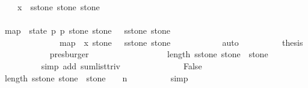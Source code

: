 \begin{isabellebody}
\ {\isachardoublequoteopen}{\isachardot}{\isachardot}{\isachardot}\ {\isacharequal}\ {\isacharparenleft}{\isasymSum}\ x\ {\isasymleftarrow}\ {\isacharquery}sstone\ stone{\isachardot}\ stone\ {\isacharplus}\ {}{\isacharparenright}{\isachardoublequoteclose}\isanewline
\ \ \ \ \ \ \isamarkupfalse%
{\isacharminus}\ \ \ \ \ \ \ \ \ \ \ \ \ \ \ \ \ \ \ \ \ \ \ \ \ \ \ \ \ \ \ \ \ \ \ \ \ \ \ \ \ \ \ \ \ \ \ \isanewline
\ \ \ \ \ \ \ \ \isamarkupfalse%
\ {\isachardoublequoteopen}map\ {\isacharparenleft}{\isasymlambda}\ {\isacharparenleft}state{\isacharcomma}\ p{}{\isacharcomma}\ p{}{\isacharcomma}\ stone{\isacharparenright}{\isachardot}\ stone\ {\isacharplus}\ {}{\isacharparenright}\ {\isacharparenleft}{\isacharquery}sstone\ stone{\isacharparenright}\ {\isacharequal}\ \isanewline
\ \ \ \ \ \ \ \ \ \ \ \ \ \ map\ {\isacharparenleft}{\isasymlambda}\ x{\isachardot}\ stone\ {\isacharplus}\ {}{\isacharparenright}\ {\isacharparenleft}{\isacharquery}sstone\ stone{\isacharparenright}{\isachardoublequoteclose}\isanewline
\ \ \ \ \ \ \ \ \ \ \isamarkupfalse%
\ auto\isanewline
\ \ \ \ \ \ \ \ \isamarkupfalse%
\ {\isacharquery}thesis\isanewline
\ \ \ \ \ \ \ \ \ \ \isamarkupfalse%
\ presburger\isanewline
\ \ \ \ \ \ \isamarkupfalse%
\isanewline
\ \ \ \ \ \ \isamarkupfalse%
\ \isamarkupfalse%
\ {\isachardoublequoteopen}{\isachardot}{\isachardot}{\isachardot}\ {\isacharequal}\ length\ {\isacharparenleft}{\isacharquery}sstone\ stone{\isacharparenright}\ {\isacharasterisk}\ {\isacharparenleft}stone\ {\isacharplus}\ {}{\isacharparenright}{\isachardoublequoteclose}\isanewline
\ \ \ \ \ \ \ \ \isamarkupfalse%
\ {\isacharparenleft}simp\ add{\isacharcolon}\ sum{\isacharunderscore}list{\isacharunderscore}triv{\isacharparenright}\isanewline
\ \ \ \ \ \ \isamarkupfalse%
\isanewline
\ \ \ \ \ \ \isamarkupfalse%
\ False\isanewline
\ \ \ \ \ \ \ \ \isamarkupfalse%
\ {\isacharbackquoteopen}length\ {\isacharparenleft}{\isacharquery}sstone\ stone{\isacharparenright}\ {\isacharasterisk}\ {\isacharparenleft}stone\ {\isacharplus}\ {}{\isacharparenright}\ {\isacharless}\ n{\isacharbackquoteclose}\isanewline
\ \ \ \ \ \ \ \ \isamarkupfalse%
\ simp\isanewline
\ \ \ \ \isamarkupfalse%
\isanewline
\ \ \isamarkupfalse%
\isanewline
\ \ \isamarkupfalse%
\ \isamarkupfalse%

\end{isabellebody}

